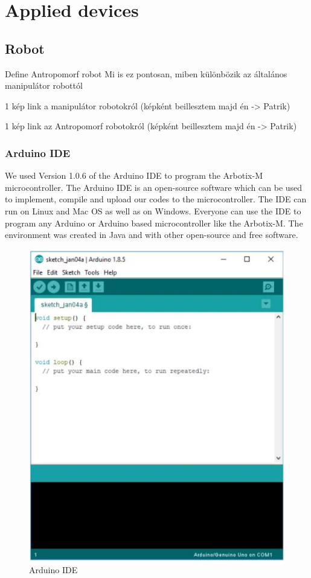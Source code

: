 
\chapter{Applied devices}

\section{Robot}

	Define Antropomorf robot
		Mi is ez pontosan, miben különbözik az általános manipulátor robottól
		
		1 kép link a manipulátor robotokról (képként beillesztem majd én -> Patrik)
		
		1 kép link az Antropomorf robotokról (képként beillesztem majd én -> Patrik)

	\subsection{Arduino IDE}
	
		We used Version 1.0.6 of the Arduino IDE to program the Arbotix-M microcontroller. The Arduino IDE is an open-source software which can be used to implement, compile and upload our codes to the microcontroller. The IDE can run on Linux and Mac OS as well as on Windows. Everyone can use the IDE to program any Arduino or Arduino based microcontroller like the Arbotix-M. The environment was created in Java and with other open-source and free software.
	
			\begin{figure}[ht]
				\centering
				\includegraphics[scale=0.65]{./images/arduino_ide}
				\caption{Arduino IDE \cite{arduino_ide}}
			\end{figure}
			
